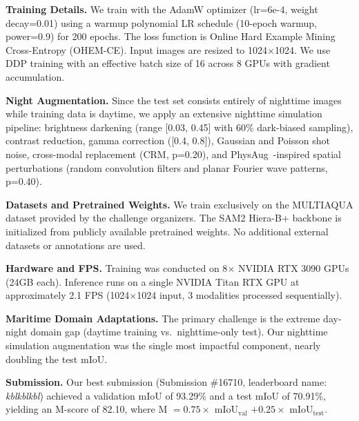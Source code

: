 \documentclass[10pt, a4paper]{article}
\begin{document}
\noindent\textbf{Training Details.}
We train with the AdamW optimizer (lr=6e-4, weight decay=0.01) using a warmup polynomial LR schedule (10-epoch warmup, power=0.9) for 200 epochs.
The loss function is Online Hard Example Mining Cross-Entropy (OHEM-CE).
Input images are resized to 1024$\times$1024.
We use DDP training with an effective batch size of 16 across 8 GPUs with gradient accumulation.

\vspace{1em}

\noindent\textbf{Night Augmentation.}
Since the test set consists entirely of nighttime images while training data is daytime, we apply an extensive nighttime simulation pipeline:
brightness darkening (range [0.03, 0.45] with 60\% dark-biased sampling), contrast reduction, gamma correction ([0.4, 0.8]), Gaussian and Poisson shot noise, cross-modal replacement (CRM, p=0.20), and PhysAug~\cite{xu2025physaug}-inspired spatial perturbations (random convolution filters and planar Fourier wave patterns, p=0.40).

\vspace{1em}

\noindent\textbf{Datasets and Pretrained Weights.}
We train exclusively on the MULTIAQUA dataset provided by the challenge organizers.
The SAM2 Hiera-B+ backbone is initialized from publicly available pretrained weights.
No additional external datasets or annotations are used.

\vspace{1em}

\noindent\textbf{Hardware and FPS.}
Training was conducted on 8$\times$ NVIDIA RTX 3090 GPUs (24GB each).
Inference runs on a single NVIDIA Titan RTX GPU at approximately 2.1 FPS (1024$\times$1024 input, 3 modalities processed sequentially).

\vspace{1em}

\noindent\textbf{Maritime Domain Adaptations.}
The primary challenge is the extreme day-night domain gap (daytime training vs.\ nighttime-only test).
Our nighttime simulation augmentation was the single most impactful component, nearly doubling the test mIoU.

\vspace{1em}

\noindent\textbf{Submission.}
Our best submission (Submission \#16710, leaderboard name: \textit{kblkblkbl}) achieved a validation mIoU of 93.29\% and a test mIoU of 70.91\%, yielding an M-score of 82.10, where M $= 0.75 \times$ mIoU$_{\mathrm{val}}$ $+ 0.25 \times$ mIoU$_{\mathrm{test}}$.

{\small


}
\end{document}

